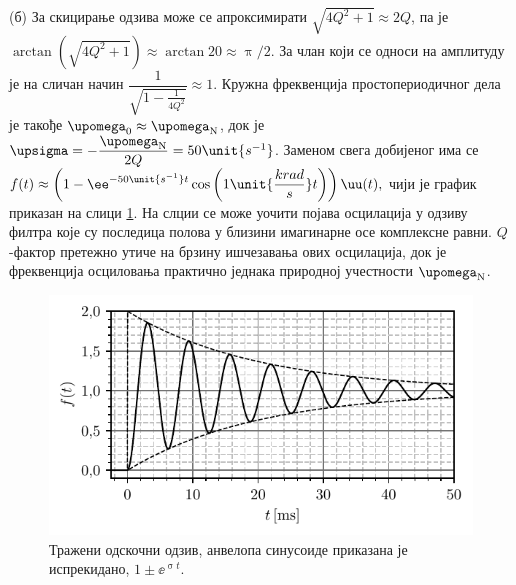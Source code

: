 (б) За скицирање одзива може се апроксимирати $\sqrt{4Q^2 + 1} \approx 2Q$, па је 
$\arctan(\sqrt{4Q^2 + 1}) \approx \arctan 20 \approx \uppi/2$. За члан који се односи на амплитуду је на сличан начин 
$
\dfrac{1}{\sqrt{1 - \frac{1}{4Q^2}} } \approx 1
$. Кружна фреквенција простопериодичног дела је такође $\upomega_{\rm 0} \approx \upomega_{\rm N}$, док је 
$\upsigma = -\dfrac{\upomega_{\rm N}}{2Q} = 50\unit{s^{-1}}$. Заменом свега добијеног има се 
$
    f(t) \approx \left(
        1 - \ee^{- 50\unit{s^{-1}} t } \cos \left( 1\unit{\dfrac{krad}{s}} t \right)
    \right) \uu(t),
$ чији је график приказан на слици \ref{fig:\ID.odziv}. На слции се може уочити појава осцилација у одзиву филтра које су  
последица полова у близини имагинарне осе комплексне равни. $Q$-фактор претежно утиче на брзину ишчезавања ових осцилација, 
док је фреквенција осциловања практично једнака природној учестности $\upomega_{\rm N}$. 
\begin{figure}[ht!]
    \centering
    \includegraphics{fig/Q_odziv.pdf}
    \caption{Тражени одскочни одзив, анвелопа синусоиде приказана је испрекидано, 
    $1 \pm \ee^{\upsigma t}$.}
    \label{fig:\ID.odziv}
\end{figure}

